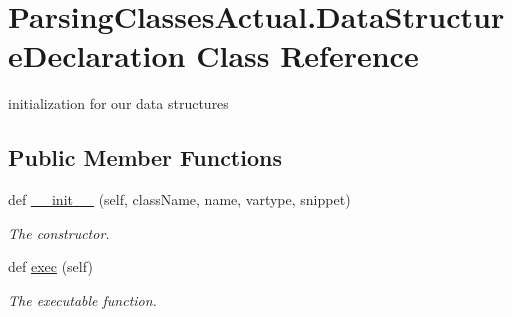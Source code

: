 \hypertarget{class_parsing_classes_actual_1_1_data_structure_declaration}{}\section{Parsing\+Classes\+Actual.\+Data\+Structure\+Declaration Class Reference}
\label{class_parsing_classes_actual_1_1_data_structure_declaration}


initialization for our data structures  


\subsection*{Public Member Functions}
\begin{DoxyCompactItemize}
\item 
def \hyperlink{class_parsing_classes_actual_1_1_data_structure_declaration_aa30264067a870240581f89487ee4834c}{\+\_\+\+\_\+init\+\_\+\+\_\+} (self, class\+Name, name, vartype, snippet)
\begin{DoxyCompactList}\small\item\em The constructor. \end{DoxyCompactList}\item 
def \hyperlink{class_parsing_classes_actual_1_1_data_structure_declaration_a69e6e4ab0c53bd579815a03bd333c88c}{exec} (self)\hypertarget{class_parsing_classes_actual_1_1_data_structure_declaration_a69e6e4ab0c53bd579815a03bd333c88c}{}\label{class_parsing_classes_actual_1_1_data_structure_declaration_a69e6e4ab0c53bd579815a03bd333c88c}

\begin{DoxyCompactList}\small\item\em The executable function. \end{DoxyCompactList}\end{DoxyCompactItemize}
